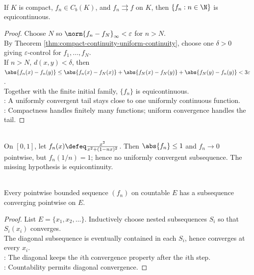 \begin{theorem} \label{thm:uniform-convergence-implies-equicontinuity-on-compact} \\
If $K$ is compact, $f_n\in C_b(K)$, and $f_n\rightrightarrows f$ on $K$, then $\{f_n:n\in\N\}$ is equicontinuous.
\begin{proof}
Choose $N$ so $\norm{f_n-f_N}_{\infty}<\varepsilon$ for $n>N$.\\
By Theorem \ref{thm:compact-continuity-uniform-continuity}, choose one $\delta>0$ giving $\varepsilon$-control for $f_1,\ldots,f_N$.\\
If $n>N$, $d(x,y)<\delta$, then $\abs{f_n(x)-f_n(y)} \leq \abs{f_n(x)-f_N(x)}+\abs{f_N(x)-f_N(y)}+\abs{f_N(y)-f_n(y)}<3\varepsilon$.\\
Together with the finite initial family, $\{f_n\}$ is equicontinuous.\\
: A uniformly convergent tail stays close to one uniformly continuous function.\\
: Compactness handles finitely many functions; uniform convergence handles the tail.
\end{proof}
\end{theorem}

\begin{example} \label{ex:uniform-boundedness-without-uniform-subsequence} \\
On $[0,1]$, let $f_n(x)\defeq \frac{x^2}{x^2+(1-nx)^2}$. Then $\abs{f_n}\leq1$ and $f_n\to0$ pointwise, but $f_n(1/n)=1$; hence no uniformly convergent subsequence. The missing hypothesis is equicontinuity.
\end{example}

\begin{theorem} \label{thm:diagonal-selection-countable-pointwise} \\
Every pointwise bounded sequence $(f_n)$ on countable $E$ has a subsequence converging pointwise on $E$.
\begin{proof}
List $E=\{x_1,x_2,\ldots\}$. Inductively choose nested subsequences $S_i$ so that $S_i(x_i)$ converges.\\
The diagonal subsequence is eventually contained in each $S_i$, hence converges at every $x_i$.\\
: The diagonal keeps the $i$th convergence property after the $i$th step.\\
: Countability permits diagonal convergence.
\end{proof}
\end{theorem}
